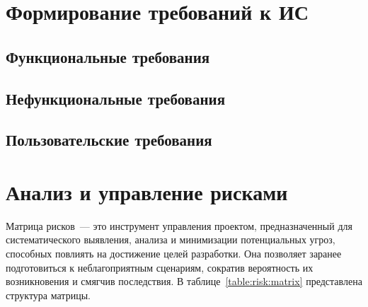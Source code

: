 \section{Формирование требований к ИС}

\subsection{Функциональные требования}

\subsection{Нефункциональные требования}

\subsection{Пользовательские требования}

\section{Анализ и управление рисками}

Матрица рисков~--- это инструмент управления проектом,
предназначенный для систематического выявления,
анализа и минимизации потенциальных угроз,
способных повлиять на достижение целей разработки.
Она позволяет заранее подготовиться к неблагоприятным сценариям,
сократив вероятность их возникновения и смягчив последствия.
В таблице~\ref{table:risk:matrix} представлена структура матрицы.

